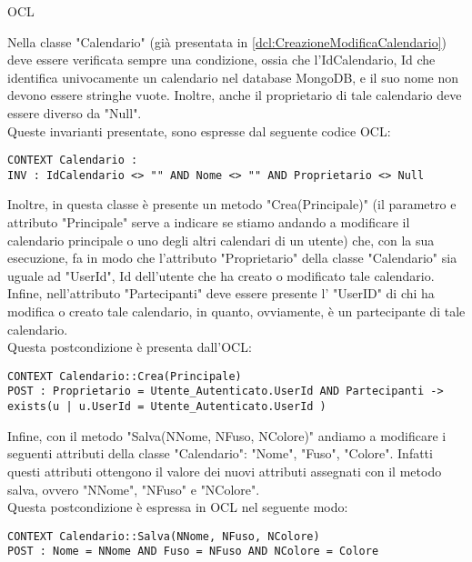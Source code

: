 \begin{listaPersonale}{OCL}
    \begin{center}
        
    \end{center}
    Nella classe "Calendario" (già presentata in \ref{dcl:CreazioneModificaCalendario}) deve essere verificata sempre una condizione, ossia che l'IdCalendario, Id che identifica univocamente un calendario nel database MongoDB, e il suo nome non devono essere stringhe vuote. Inoltre, anche il proprietario di tale calendario deve essere diverso da "Null".\\
    Queste invarianti presentate, sono espresse dal seguente codice OCL:
    \begin{lstlisting}
CONTEXT Calendario :
INV : IdCalendario <> "" AND Nome <> "" AND Proprietario <> Null
    \end{lstlisting}
    Inoltre, in questa classe è presente un metodo "Crea(Principale)" (il parametro e attributo "Principale" serve a indicare se stiamo andando a modificare il calendario principale o uno degli altri calendari di un utente) che, con la sua esecuzione, fa in modo che l'attributo "Proprietario" della classe "Calendario" sia uguale ad "UserId", Id dell'utente che ha creato o modificato tale calendario. Infine, nell'attributo "Partecipanti" deve essere presente l' "UserID" di chi ha modifica o creato tale calendario, in quanto, ovviamente, è un partecipante di tale calendario. \\
    Questa postcondizione è presenta dall'OCL:
    \begin{lstlisting}
CONTEXT Calendario::Crea(Principale)
POST : Proprietario = Utente_Autenticato.UserId AND Partecipanti -> exists(u | u.UserId = Utente_Autenticato.UserId )
    \end{lstlisting}
    Infine, con il metodo "Salva(NNome, NFuso, NColore)" andiamo a modificare i seguenti attributi della classe "Calendario": "Nome", "Fuso", "Colore". Infatti questi attributi ottengono il valore dei nuovi attributi assegnati con il metodo salva, ovvero "NNome", "NFuso" e "NColore". \\
    Questa postcondizione è espressa in OCL nel seguente modo:
    \begin{lstlisting}
CONTEXT Calendario::Salva(NNome, NFuso, NColore)
POST : Nome = NNome AND Fuso = NFuso AND NColore = Colore
    \end{lstlisting}
    \newpage




\end{listaPersonale}
